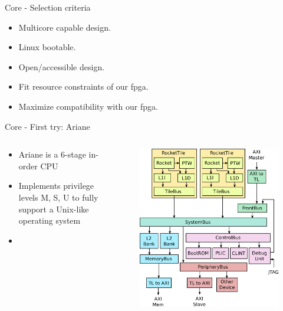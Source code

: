\begin{frame}{Core - Selection criteria}
  \begin{itemize}
    \item Multicore capable design.
    \item Linux bootable.
    \item Open/accessible design.
    \item Fit resource constraints of our fpga. 
    \item Maximize compatibility with our fpga.
  \end{itemize}
\end{frame}

\begin{frame}{Core - First try: Ariane}
\begin{columns}[T]
  \begin{column}{0.5\textwidth} %

\begin{itemize}
    \item Ariane is a 6-stage in-order CPU
    \item Implements privilege levels M, S, U to fully support a Unix-like operating system
    \item 
\end{itemize}
\end{column}
\begin{column}{.5\textwidth} %

\begin{figure}[!ht]
    \includegraphics[width=1\linewidth]{images/rocketchip-diagram.png}
\end{figure}
\end{column}
\end{columns}
\end{frame}


